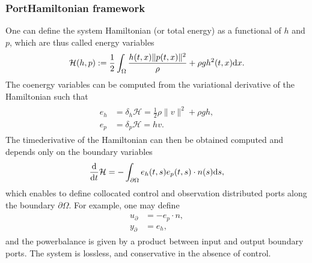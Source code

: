 \documentclass[letterpaper,10pt,english]{sphinxmanual}
\begin{document}
\subsubsection{Port\sphinxhyphen{}Hamiltonian framework}
\label{\detokenize{examples/shallow_water:port-hamiltonian-framework}}
\sphinxAtStartPar
One can define the system Hamiltonian (or total energy) as a functional
of \(h\) and \(p\), which are thus called energy variables
\begin{equation*}
\begin{split}\mathcal{H} (h,p) := \frac{1}{2} \int_\Omega \frac{h(t,x) \| p(t,x) \|^2}{\rho} + \rho g h^2(t,x) {\rm d}x.\end{split}
\end{equation*}
\sphinxAtStartPar
The co\sphinxhyphen{}energy variables can be computed from the variational derivative
of the Hamiltonian such that
\begin{equation*}
\begin{split}\begin{split}
    e_h & = \delta_h \mathcal{H} = \frac{1}{2} \rho \| v \|^2 +  \rho g h , \\
    e_p & = \delta_{p} \mathcal{H} = h v .
\end{split}\end{split}
\end{equation*}
\sphinxAtStartPar
The time\sphinxhyphen{}derivative of the Hamiltonian can then be obtained computed and
depends only on the boundary variables
\begin{equation*}
\begin{split}\frac{\rm d}{{\rm d}t} \mathcal{H} =  - \int_{\partial\Omega} e_h(t,s) e_p(t,s) \cdot n(s) {\rm d}s ,\end{split}
\end{equation*}
\sphinxAtStartPar
which enables to define collocated control and observation distributed
ports along the boundary \(\partial\Omega\). For example, one may
define
\begin{equation*}
\begin{split}\begin{split}
     u_{\partial} & = - e_p \cdot n,\\
     y_{\partial} & = e_h,
 \end{split}\end{split}
\end{equation*}
\sphinxAtStartPar
and the power\sphinxhyphen{}balance is given by a product between input and output
boundary ports. The system is lossless, and conservative in the absence
of control.
\end{document}
